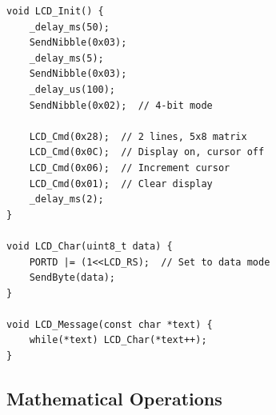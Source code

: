 \documentclass{article}
\begin{document}
\begin{lstlisting}[caption=LCD Initialization, label=lst:lcd]
void LCD_Init() {
    _delay_ms(50);
    SendNibble(0x03);
    _delay_ms(5);
    SendNibble(0x03);
    _delay_us(100);
    SendNibble(0x02);  // 4-bit mode
    
    LCD_Cmd(0x28);  // 2 lines, 5x8 matrix
    LCD_Cmd(0x0C);  // Display on, cursor off
    LCD_Cmd(0x06);  // Increment cursor
    LCD_Cmd(0x01);  // Clear display
    _delay_ms(2);
}

void LCD_Char(uint8_t data) {
    PORTD |= (1<<LCD_RS);  // Set to data mode
    SendByte(data);
}

void LCD_Message(const char *text) {
    while(*text) LCD_Char(*text++);
}
\end{lstlisting}

\subsection{Mathematical Operations}
\end{document}
